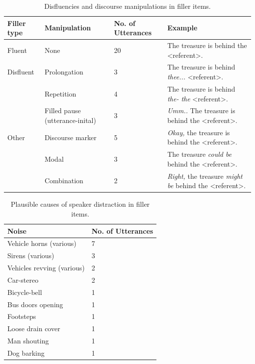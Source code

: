 \documentclass[man]{apa6}
\begin{document}
\begin{table}
\begin{tabularx}{\linewidth}{|X|X|X|X|}
  \hline
Filler type & Manipulation & No. of Utterances & Example \\
  \hline
Fluent & None & 20 & The treasure is behind the \textless referent\textgreater . \\
Disfluent & Prolongation & 3 & The treasure is behind \textit{thee...} \textless referent\textgreater . \\
& Repetition & 4 & The treasure is behind \textit{the- the} \textless referent\textgreater .\\
& Filled pause (utterance-inital) & 3 & \textit{Umm..} The treasure is behind the \textless referent\textgreater .\\
Other & Discourse marker & 5 & \textit{Okay,} the treasure is behind the \textless referent\textgreater .\\
& Modal & 3 & The treasure \textit{could be} behind the \textless referent\textgreater .\\ 
& Combination & 2 & \textit{Right,} the treasure \textit{might be} behind the \textless referent\textgreater .\\
   \hline
\end{tabularx}
\caption{Disfluencies and discourse manipulations in filler items.}
\label{table:fillers}
\end{table}

\begin{table}
\begin{tabularx}{\linewidth}{|X|X|}
\hline
Noise & No. of Utterances\\
\hline
Vehicle horns (various) & 7 \\
Sirens (various) & 3 \\
Vehicles revving (various) & 2 \\
Car-stereo & 2 \\
Bicycle-bell & 1 \\
Bus doors opening & 1 \\
Footsteps & 1 \\
Loose drain cover & 1 \\
Man shouting & 1 \\
Dog barking & 1 \\
\hline
\end{tabularx}
\caption{Plausible causes of speaker distraction in filler items.}
\label{table:fillernoise}
\end{table}
\end{document}
